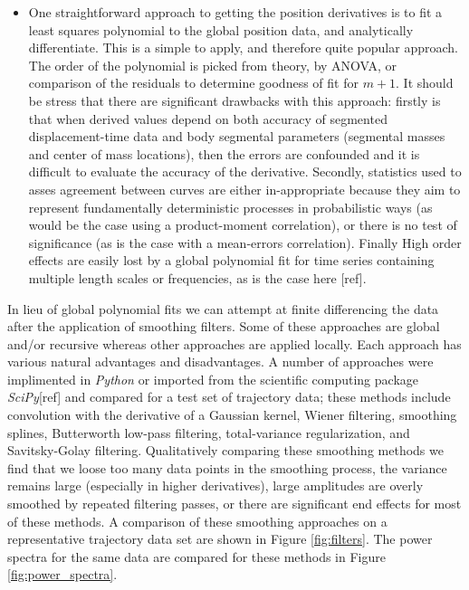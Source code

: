 \documentclass[a4paper, 12pt]{article}
\begin{document}
\begin{itemize}
\item One straightforward approach to getting the position derivatives is to fit a least squares polynomial to the global position data, and analytically differentiate. This is a simple to apply, and therefore quite popular approach. The order of the polynomial is picked from theory, by ANOVA, or comparison of the residuals to determine goodness of fit for $m+1$. It should be stress that there are significant drawbacks with this approach: firstly is that when derived values depend on both accuracy of segmented displacement-time data and body segmental parameters (segmental masses and center of mass locations), then the errors are confounded and it is difficult to evaluate the accuracy of the derivative. Secondly, statistics used to asses agreement between curves are either in-appropriate because they aim to represent fundamentally deterministic processes in probabilistic ways (as would be the case using a product-moment correlation), or there is no test of significance (as is the case with a mean-errors correlation). Finally High order effects are easily lost by a global polynomial fit for time series containing multiple length scales or frequencies, as is the case here [ref].
\end{itemize}

In lieu of global polynomial fits we can attempt at finite differencing the data after the application of smoothing filters. Some of these approaches are global and/or recursive whereas other approaches are applied locally. Each approach has various natural advantages and disadvantages. A number of approaches were implimented in \emph{Python} or imported from the scientific computing package \emph{SciPy}[ref] and compared for a test set of trajectory data; these methods include convolution with the derivative of a Gaussian kernel, Wiener filtering, smoothing splines, Butterworth low-pass filtering, total-variance regularization, and Savitsky-Golay filtering. Qualitatively comparing these smoothing methods we find that we loose too many data points in the smoothing process, the variance remains large (especially in higher derivatives), large amplitudes are overly smoothed by repeated filtering passes, or there are significant end effects for most of these methods. A comparison of these smoothing approaches on a representative trajectory data set are shown in Figure \ref{fig:filters}. The power spectra for the same data are compared for these methods in Figure \ref{fig:power_spectra}.

\end{document}
